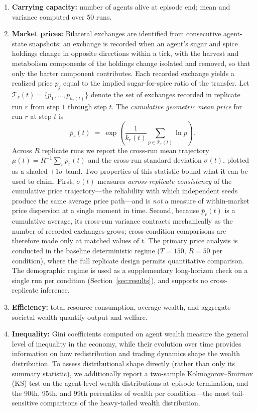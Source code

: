 \documentclass[pdflatex,sn-mathphys-num]{sn-jnl}%
\theoremstyle{thmstyleone}%
\theoremstyle{thmstyletwo}%
\theoremstyle{thmstylethree}%
\begin{document}
\begin{enumerate}
\item \textbf{Carrying capacity:} number of agents alive at episode end; mean and variance computed over 50 runs.  

\item \textbf{Market prices:} Bilateral exchanges are identified from consecutive
agent-state snapshots: an exchange is recorded when an agent's sugar and spice
holdings change in opposite directions within a tick, with the harvest and
metabolism components of the holdings change isolated and removed, so that only
the barter component contributes. Each recorded exchange yields a realized price
$p_j$ equal to the implied sugar-for-spice ratio of the transfer. Let
$\mathcal{T}_r(t) = \{p_1, \ldots, p_{k_r(t)}\}$ denote the set of exchanges
recorded in replicate run $r$ from step $1$ through step $t$. The
\emph{cumulative geometric mean price} for run $r$ at step $t$ is
\[
\bar{p}_r(t) \;=\; \exp\!\left(\frac{1}{k_r(t)} \sum_{p \in \mathcal{T}_r(t)} \ln p\right).
\]
Across $R$ replicate runs we report the cross-run mean trajectory
$\mu(t) = R^{-1}\sum_r \bar{p}_r(t)$ and the cross-run standard deviation
$\sigma(t)$, plotted as a shaded $\pm 1\sigma$ band.
Two properties of this statistic bound what it can be used to claim.
First, $\sigma(t)$ measures \emph{across-replicate consistency} of the cumulative
price trajectory---the reliability with which independent seeds produce the same
average price path---and is \emph{not} a measure of within-market price dispersion
at a single moment in time.
Second, because $\bar{p}_r(t)$ is a cumulative average, its cross-run variance
contracts mechanically as the number of recorded exchanges grows; cross-condition
comparisons are therefore made only at matched values of $t$.
The primary price analysis is conducted in the baseline deterministic regime
($T = 150$, $R = 50$ per condition), where the full replicate design permits
quantitative comparison. The demographic regime is used as a supplementary
long-horizon check on a single run per condition (Section~\ref{sec:results}),
and supports no cross-replicate inference.

\item \textbf{Efficiency:} total resource consumption, average wealth, and aggregate societal wealth quantify output and welfare.  

\item \textbf{Inequality:} Gini coefficients computed on agent wealth measure the general level of inequality in the economy, while their evolution over time provides information on how redistribution and trading dynamics shape the wealth distribution. To assess distributional shape directly (rather than only its summary statistic), we additionally report a two-sample Kolmogorov--Smirnov (KS) test on the agent-level wealth distributions at episode termination, and the 90th, 95th, and 99th percentiles of wealth per condition---the most tail-sensitive comparisons of the heavy-tailed wealth distribution.


\end{enumerate}
\end{document}
